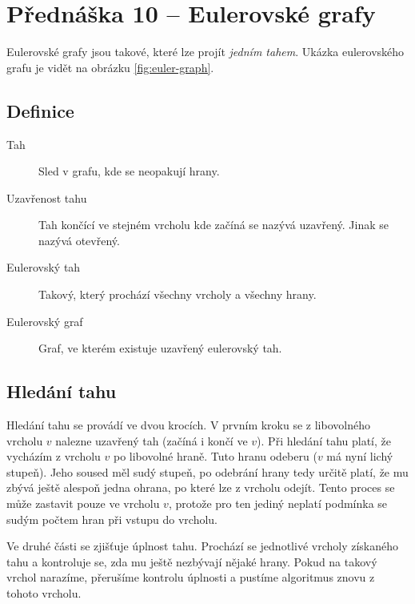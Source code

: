 \section{Přednáška 10 -- Eulerovské grafy}

Eulerovské grafy jsou takové, které lze projít \textit{jedním tahem}.
Ukázka eulerovského grafu je vidět na obrázku \ref{fig:euler-graph}.


\subsection{Definice}

\begin{description}
    \item[Tah] Sled v grafu, kde se neopakují hrany.
    \item[Uzavřenost tahu] Tah končící ve stejném vrcholu kde začíná se nazývá uzavřený.
    Jinak se nazývá otevřený.
    \item[Eulerovský tah] Takový, který prochází všechny vrcholy a všechny hrany.
    \item[Eulerovský graf] Graf, ve kterém existuje uzavřený eulerovský tah.
\end{description}

\label{lemma:veta-o-eulerovskych-grafech}

\subsection{Hledání tahu}\label{alg:euleruv-tah}

Hledání tahu se provádí ve dvou krocích.
V prvním kroku se z libovolného vrcholu $v$ nalezne uzavřený tah (začíná i končí ve $v$).
Při hledání tahu platí, že vycházím z vrcholu $v$ po libovolné hraně.
Tuto hranu odeberu ($v$ má nyní lichý stupeň).
Jeho soused měl sudý stupeň, po odebrání hrany tedy určitě platí, že mu zbývá ještě alespoň jedna ohrana, po které lze z vrcholu odejít.
Tento proces se může zastavit pouze ve vrcholu $v$, protože pro ten jediný neplatí podmínka se sudým počtem hran při vstupu do vrcholu.

Ve druhé části se zjišťuje úplnost tahu.
Prochází se jednotlivé vrcholy získaného tahu a kontroluje se, zda mu ještě nezbývají nějaké hrany.
Pokud na takový vrchol narazíme, přerušíme kontrolu úplnosti a pustíme algoritmus znovu z tohoto vrcholu.

